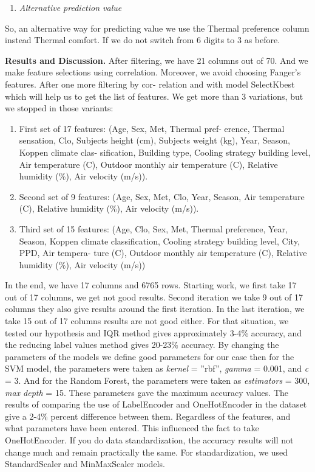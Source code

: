 \begin{multicols}{2}
\begin{enumerate}[leftmargin=*]
\def\labelenumi{\Alph{enumi}.}
\setcounter{enumi}{8}
\item
  \emph{Alternative prediction value}
\end{enumerate}

So, an alternative way for predicting value we use the Thermal
preference column instead Thermal comfort. If we do not switch from 6
digits to 3 as before.

{\bfseries Results and Discussion.} After filtering, we have 21 columns out
of 70. And we make feature selections using correlation. Moreover, we
avoid choosing Fanger's features. After one more filtering by cor-
relation and with model SelectKbest which will help us to get the list
of features. We get more than 3 variations, but we stopped in those
variants:

\begin{enumerate}[leftmargin=*]
\def\labelenumi{\arabic{enumi})}
\item
  First set of 17 features: (Age, Sex, Met, Thermal pref- erence,
  Thermal sensation, Clo, Subjects height (cm), Subjects weight (kg),
  Year, Season, Koppen climate clas- sification, Building type, Cooling
  strategy building level, Air temperature (C), Outdoor monthly air
  temperature (C), Relative humidity (\%), Air velocity (m/s)).
\item
  Second set of 9 features: (Age, Sex, Met, Clo, Year, Season, Air
  temperature (C), Relative humidity (\%), Air velocity (m/s)).
\item
  Third set of 15 features: (Age, Clo, Sex, Met, Thermal preference,
  Year, Season, Koppen climate classification, Cooling strategy building
  level, City, PPD, Air tempera- ture (C), Outdoor monthly air
  temperature (C), Relative humidity (\%), Air velocity (m/s))
\end{enumerate}

In the end, we have 17 columns and 6765 rows. Starting work, we first
take 17 out of 17 columns, we get not good results. Second iteration we
take 9 out of 17 columns they also give results around the first
iteration. In the last iteration, we take 15 out of 17 columns results
are not good either. For that situation, we tested our hypothesis and
IQR method gives approximately 3-4\% accuracy, and the reducing label
values method gives 20-23\% accuracy. By changing the parameters of the
models we define good parameters for our case then for the SVM model,
the parameters were taken as \emph{kernel} = ''rbf'', \emph{gamma} =
0.001, and \emph{c} = 3. And for the Random Forest, the parameters were
taken as \emph{estimators} = 300, \emph{max depth} = 15. These
parameters gave the maximum accuracy values. The results of comparing
the use of LabelEncoder and OneHotEncoder in the dataset give a 2-4\%
percent difference between them. Regardless of the features, and what
parameters have been entered. This influenced the fact to take
OneHotEncoder. If you do data standardization, the accuracy results will
not change much and remain practically the same. For standardization, we
used StandardScaler and MinMaxScaler models.


\end{multicols}

